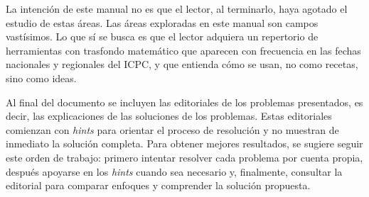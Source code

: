 La intención de este manual no es que el lector, al terminarlo, haya agotado el estudio de estas áreas. Las áreas exploradas en este manual son campos vastísimos. Lo que sí se busca es que el lector adquiera un repertorio de herramientas con trasfondo matemático que aparecen con frecuencia en las fechas nacionales y regionales del ICPC, y que entienda cómo se usan, no como recetas, sino como ideas.
 
Al final del documento se incluyen las editoriales de los problemas presentados, es decir, las explicaciones de las soluciones de los problemas. Estas editoriales comienzan con \textit{hints} para orientar el proceso de resolución y no muestran de inmediato la solución completa. Para obtener mejores resultados, se sugiere seguir este orden de trabajo: primero intentar resolver cada problema por cuenta propia, después apoyarse en los \textit{hints} cuando sea necesario y, finalmente, consultar la editorial para comparar enfoques y comprender la solución propuesta.

